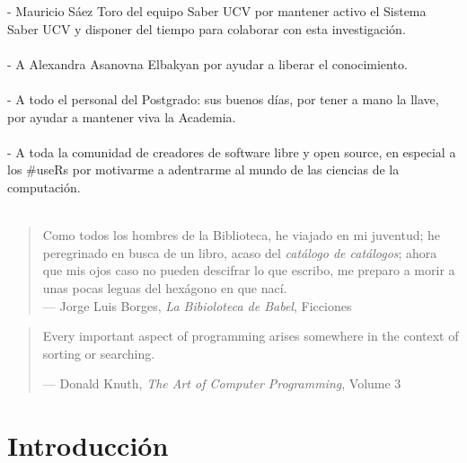 \documentclass[
  12pt,
  openany]{book}
\begin{document}
- Mauricio Sáez Toro del equipo Saber UCV por mantener activo el Sistema Saber UCV y disponer del tiempo para colaborar con esta investigación.\\\\
- A Alexandra Asanovna Elbakyan por ayudar a liberar el conocimiento.\\\\
- A todo el personal del Postgrado: sus buenos días, por tener a mano la llave, por ayudar a mantener viva la Academia.\\\\
- A toda la comunidad de creadores de software libre y open source, en especial a los \#useRs por motivarme a adentrarme al mundo de las ciencias de la computación.\\\\


\newpage
\thispagestyle{empty}
\vspace*{5cm}
\hfill
\begin{minipage}{0.70\textwidth}
\begin{quote}
Como todos los hombres de la Biblioteca, he viajado en mi juventud; he peregrinado en busca de un libro, acaso del \emph{catálogo de catálogos}; ahora que mis ojos caso no pueden descifrar lo que escribo, me preparo a morir a unas pocas leguas del hexágono en que nací.\\
--- Jorge Luis Borges, \textit{La Bibioloteca de Babel}, Ficciones
\end{quote}
\hspace*{2cm}

\begin{quote}
Every important aspect of programming arises somewhere in the context of sorting or searching.

--- Donald Knuth, \textit{The Art of Computer Programming}, Volume 3
\end{quote}
\end{minipage}

\thispagestyle{empty}
\maketitle



{
\setcounter{tocdepth}{2}
\tableofcontents
}
\listoffigures
\listoftables
\clearpage
{}

\hypertarget{introduccion}{%
\chapter{Introducción}\label{introduccion}}
\end{document}
